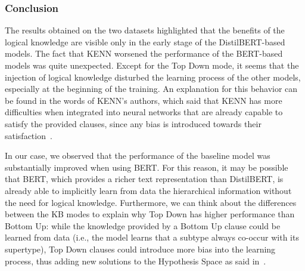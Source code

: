 \subsubsection{Conclusion}
The results obtained on the two datasets highlighted that the benefits of the logical knowledge are visible only in the early stage of the DistilBERT-based models. The fact that KENN worsened the performance of the BERT-based models was quite unexpected. Except for the Top Down mode, it seems that the injection of logical knowledge disturbed the learning process of the other models, especially at the beginning of the training. An explanation for this behavior can be found in the words of KENN's authors, which said that KENN has more difficulties when integrated into neural networks that are already capable to satisfy the provided clauses, since any bias is introduced towards their satisfaction~\cite{daniele2021neural}.

In our case, we observed that the performance of the baseline model was substantially improved when using BERT. For this reason, it may be possible that BERT, which provides a richer text representation than DistilBERT, is already able to implicitly learn from data the hierarchical information without the need for logical knowledge. Furthermore, we can think about the differences between the KB modes to explain why Top Down has higher performance than Bottom Up: while the knowledge provided by a Bottom Up clause could be learned from data (i.e., the model learns that a subtype always co-occur with its supertype), Top Down clauses could introduce more bias into the learning process, thus adding new solutions to the Hypothesis Space as said in~\cite{daniele2021neural}.